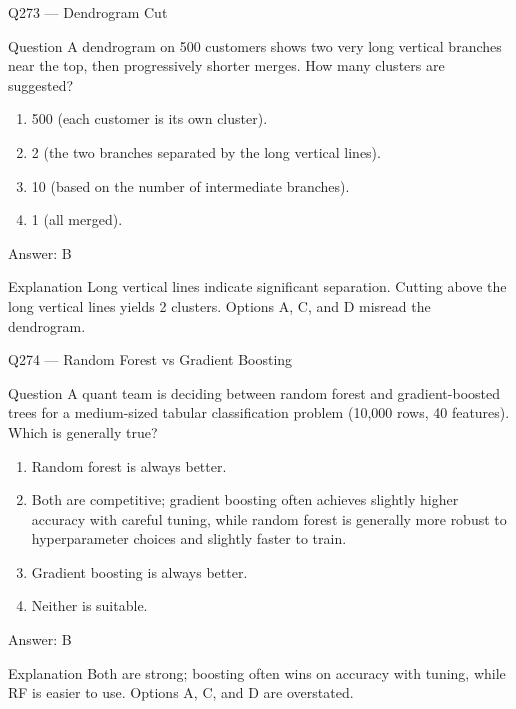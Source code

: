 \documentclass[aspectratio=169,8pt]{beamer}
\begin{document}
\begin{frame}{Q273 --- Dendrogram Cut}
\begin{block}{Question}
A dendrogram on 500 customers shows two very long vertical branches near the top, then progressively shorter merges. How many clusters are suggested?
\end{block}
\begin{enumerate}
\item 500 (each customer is its own cluster).
\item 2 (the two branches separated by the long vertical lines).
\item 10 (based on the number of intermediate branches).
\item 1 (all merged).
\end{enumerate}
\begin{exampleblock}{Answer: B}\end{exampleblock}
\begin{block}{Explanation}
Long vertical lines indicate significant separation. Cutting above the long vertical lines yields 2 clusters. Options A, C, and D misread the dendrogram.
\end{block}
\end{frame}

\begin{frame}{Q274 --- Random Forest vs Gradient Boosting}
\begin{block}{Question}
A quant team is deciding between random forest and gradient-boosted trees for a medium-sized tabular classification problem (10,000 rows, 40 features). Which is generally true?
\end{block}
\begin{enumerate}
\item Random forest is always better.
\item Both are competitive; gradient boosting often achieves slightly higher accuracy with careful tuning, while random forest is generally more robust to hyperparameter choices and slightly faster to train.
\item Gradient boosting is always better.
\item Neither is suitable.
\end{enumerate}
\begin{exampleblock}{Answer: B}\end{exampleblock}
\begin{block}{Explanation}
Both are strong; boosting often wins on accuracy with tuning, while RF is easier to use. Options A, C, and D are overstated.
\end{block}
\end{frame}
\end{document}
